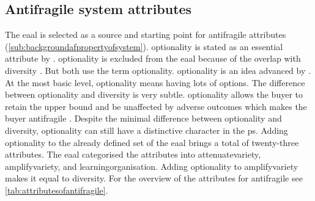 \subsection{Antifragile system attributes}
\label{sub:attributesofantifragile}
The \acrlong{eaal} is selected as a source and starting point for \gls{antifragile} attributes (\cref{sub:backgroundafpropertyofsystem}). \Gls{optionality} is stated as an essential attribute by \textcites{Taleb2012}[p.~64]{Botjes2020}. \Gls{optionality} is excluded from the \acrlong{eaal} because of the overlap with \gls{diversity} \parencite[p.~64]{Botjes2020}. But \textcites{Taleb2012}[p.~9]{Gorgeon2015} both use the term \gls{optionality}. \Gls{optionality} is an idea advanced by \textcite{Taleb2012}. At the most basic level, \gls{optionality} means having lots of options. The difference between \gls{optionality} and \gls{diversity} is very subtle. \Gls{optionality} allows the buyer to retain the upper bound and be unaffected by adverse outcomes which makes the buyer \gls{antifragile} \parencite{Cunff2020}. Despite the minimal difference between \gls{optionality} and \gls{diversity}, \gls{optionality} can still have a distinctive character in the \gls{ps}. Adding \gls{optionality} to the already defined set of the \acrlong{eaal} brings a total of twenty-three attributes. The \acrlong{eaal} categorised the attributes into \gls{attenuatevariety}, \gls{amplifyvariety}, and \gls{learningorganisation}. Adding \gls{optionality} to \gls{amplifyvariety} makes it equal to \gls{diversity}. For the overview of the \glspl{attribute} for \gls{antifragile} see \cref{tab:attributesofantifragile}. 
